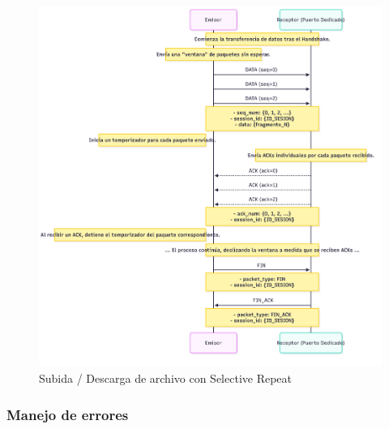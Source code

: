 \begin{figure}[H]
    \centering
    \includegraphics[height=1\textheight]{images/UPLOAD_DOWNLOAD_SR}
    \caption{Subida / Descarga de archivo con Selective Repeat}
    \label{fig:upload_download_sr}
\end{figure}

\subsubsection{Manejo de errores}

